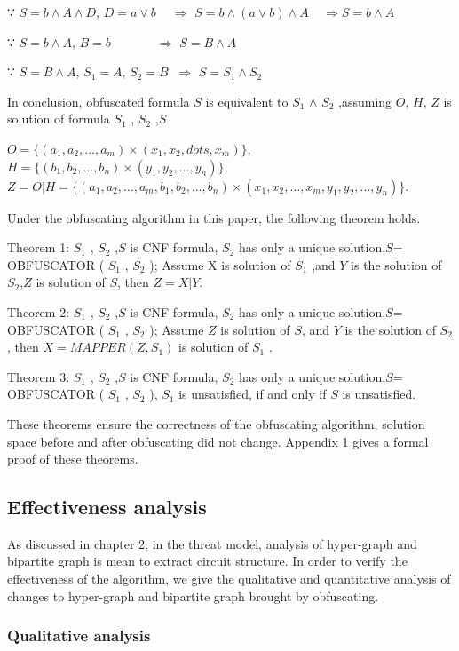 \documentclass[runningheads,a4paper]{llncs}
\begin{document}
∵ $S=b\wedge A\wedge D$,  $D=a\vee b$  $~~~~\Longrightarrow$ $S=b\wedge (a\vee b)\wedge A ~~~~~\Longrightarrow S=b\wedge A$

∵ $S=b\wedge A$, $B=b$  $~~~~~~~~~~~~~~~\Longrightarrow$ $S= B\wedge A$ 

∵ $S=B\wedge A$,    $S_1=A$,  $S_2=B$   $~\Longrightarrow$ $S= S_1\wedge S_2$ 

In conclusion, obfuscated formula $S$ is equivalent to $S_1$ $\wedge$  $S_2$ ,assuming $O$, $H$, $Z$ is solution of formula $S_1$ , $S_2$ ,$S$ 

$O=\{(a_1,a_2,\dots,a_m)\times(x_1,x_2,dots,x_m)\}$, $H=\{(b_1,b_2,\dots,b_n)\times(y_1,y_2,\dots,y_n)\}$, 
$Z=O|H=\{(a_1,a_2,\dots,a_m,b_1,b_2,\dots,b_n)\times(x_1,x_2,\dots,x_m,y_1,y_2,\dots,y_n)\}$.

Under the obfuscating algorithm in this paper, the following theorem holds.

Theorem 1: $S_1$ , $S_2$ ,$S$ is CNF formula, $S_2$ has only a unique solution,$S$= OBFUSCATOR ( $S_1$ , $S_2$ ); 
Assume X is solution of $S_1$ ,and $Y$ is the solution of $S_2$,$Z$ is solution of $S$,
then $Z = X | Y$.

Theorem 2: $S_1$ , $S_2$ ,$S$ is CNF formula, $S_2$ has only a unique solution,$S$= OBFUSCATOR ( $S_1$ , $S_2$ ); 
Assume $Z$ is solution of $S$, and $Y$ is the solution of $S_2$ , 
then $X = MAPPER (Z, S_1)$ is solution of $S_1$ .

Theorem 3: $S_1$ , $S_2$ ,$S$ is CNF formula, $S_2$ has only a unique solution,$S$= OBFUSCATOR ( $S_1$ , $S_2$ ),
$S_1$  is unsatisfied, if and only if $S$ is unsatisfied.

These theorems ensure the correctness of the obfuscating algorithm, solution space before and after obfuscating did not change. Appendix 1 gives a formal proof of these theorems.
\subsection{Effectiveness analysis}

As discussed in chapter 2, in the threat model, analysis of hyper-graph and bipartite graph is mean to extract circuit structure. In order to verify the effectiveness of the algorithm, we give the qualitative and quantitative analysis of changes to hyper-graph and bipartite graph brought by obfuscating.
\subsubsection{Qualitative analysis}
\end{document}
